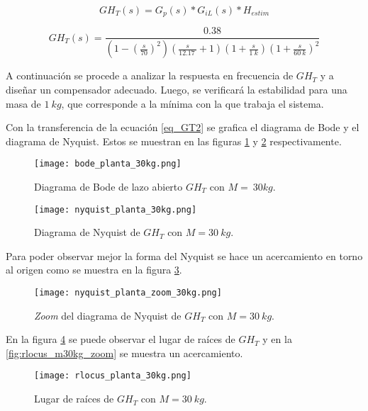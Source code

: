 \begin{equation*} \label{eq_GT1}
	GH_T(s)=G_{p}(s)*G_{iL}(s)*H_{estim} 
\end{equation*}

\begin{equation} \label{eq_GT2}
		GH_T(s)=\frac{0.38}{(1-(\frac{s}{70})^2)(\frac{s}{12.17\ }+1)(1+\frac{s}{1\:k}){(1+\frac{s}{60\:k})}^2 }	
\end{equation}

\noindent A continuación se procede a analizar la respuesta en frecuencia de $GH_T$ y a diseñar un compensador adecuado. Luego, se verificará la estabilidad para una masa de $1\:kg$, que corresponde a la mínima con la que trabaja el sistema.


\noindent Con la transferencia de la ecuación  \ref{eq_GT2} se  grafica el diagrama de Bode y el diagrama de Nyquist. Estos se muestran en las figuras \ref{fig:Diag_Bode_lazo_abierto_30kg} y \ref{fig:Diag_Nyquist_lazo_abierto_30kg} respectivamente.

\begin{figure}[H]
	\centering
	\texttt{[image: bode\_planta\_30kg.png]}
	\caption{Diagrama de Bode de lazo abierto $GH_T$ con $M=\:30 kg$.}
	\label{fig:Diag_Bode_lazo_abierto_30kg}
\end{figure}

\begin{figure}[H]
	\centering
	\texttt{[image: nyquist\_planta\_30kg.png]}
	\caption{Diagrama de Nyquist de $GH_T$ con $M=30\:kg$.}
	\label{fig:Diag_Nyquist_lazo_abierto_30kg}
\end{figure}

\noindent Para poder observar mejor la forma del Nyquist se hace un acercamiento en torno al origen como se muestra en la figura \ref{fig:Diag_Nyquist_lazo_abierto_zoom_30kg}.

\begin{figure}[H]
	\centering
	\texttt{[image: nyquist\_planta\_zoom\_30kg.png]}
	\caption{\textsl{Zoom} del diagrama de Nyquist de $GH_T$ con $M=30\:kg$.}
	\label{fig:Diag_Nyquist_lazo_abierto_zoom_30kg}
\end{figure}

\noindent En la figura \ref{fig:rlocus_m30kg} se puede observar el lugar de raíces de $GH_{T}$ y en la \ref{fig:rlocus_m30kg_zoom} se muestra un acercamiento.

\begin{figure}[H]
	\centering
	\texttt{[image: rlocus\_planta\_30kg.png]}
	\caption{Lugar de raíces de $GH_{T}$ con $M=30\:kg$.}
	\label{fig:rlocus_m30kg}
\end{figure}

